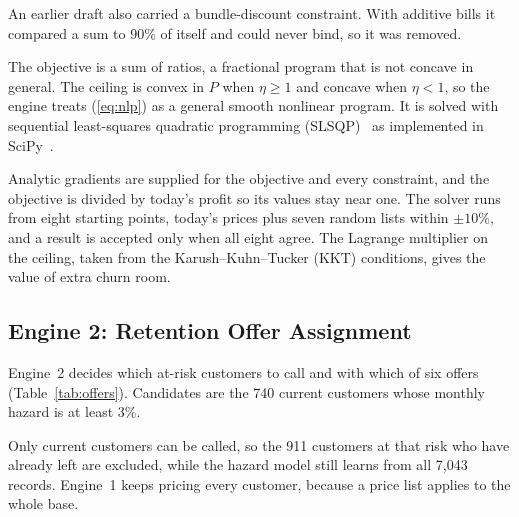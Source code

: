 \documentclass[conference]{IEEEtran}
\begin{document}
An earlier draft also carried a bundle-discount constraint. With additive bills it compared a sum to 90\% of itself and could never bind, so it was removed.

The objective is a sum of ratios, a fractional program that is not concave in general. The ceiling is convex in $P$ when $\eta \ge 1$ and concave when $\eta < 1$, so the engine treats (\ref{eq:nlp}) as a general smooth nonlinear program. It is solved with sequential least-squares quadratic programming (SLSQP)~\cite{b13} as implemented in SciPy~\cite{b15}.

Analytic gradients are supplied for the objective and every constraint, and the objective is divided by today's profit so its values stay near one. The solver runs from eight starting points, today's prices plus seven random lists within $\pm 10\%$, and a result is accepted only when all eight agree. The Lagrange multiplier on the ceiling, taken from the Karush--Kuhn--Tucker (KKT) conditions, gives the value of extra churn room.

\subsection{Engine 2: Retention Offer Assignment}
\label{sec:engine2}

Engine~2 decides which at-risk customers to call and with which of six offers (Table~\ref{tab:offers}). Candidates are the 740 current customers whose monthly hazard is at least 3\%.

Only current customers can be called, so the 911 customers at that risk who have already left are excluded, while the hazard model still learns from all 7,043 records. Engine~1 keeps pricing every customer, because a price list applies to the whole base.
\end{document}
